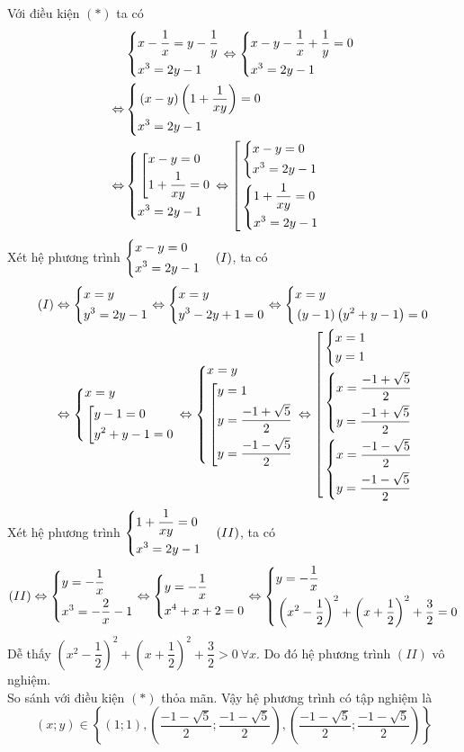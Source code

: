 \begin{ex}
{\begin{enumerate}
	Với điều kiện $(*)$ ta có
		\begin{align*}
	{ }&\left\{\begin{aligned}&x - \dfrac{1}{x} = y - \dfrac{1}{y}\\&x^3 = 2y - 1\end{aligned}\right.\Leftrightarrow \left\{\begin{aligned}&x  -  y - \dfrac{1}{x} + \dfrac{1}{y} = 0\\&x^3 = 2y - 1\end{aligned}\right.\\
	\Leftrightarrow &\left\{\begin{aligned}&\left(x  -  y\right)\left(1 + \dfrac{1}{xy}\right) = 0\\&x^3 = 2y - 1\end{aligned}\right.\\
	\Leftrightarrow &\left\{\begin{aligned}&\left[\begin{aligned}&x - y = 0\\&1 + \dfrac{1}{xy} = 0\end{aligned}\right.\\&x^3 = 2y - 1\end{aligned}\right.\Leftrightarrow \left[\begin{aligned}&\left\{\begin{aligned}&x - y = 0\\&x^3 = 2y -1\end{aligned}\right.\\&\left\{\begin{aligned}&1 + \dfrac{1}{xy} = 0\\&x^3 = 2y -1\end{aligned}\right.\end{aligned}\right.
	\end{align*}
	Xét hệ phương trình $\left\{\begin{aligned}&x - y = 0\\&x^3 = 2y - 1\end{aligned}\right.\quad (I)$, ta có 
\begin{align*}
(I)&\Leftrightarrow \left\{\begin{aligned}&x = y\\&y^3 = 2y - 1\end{aligned}\right.\Leftrightarrow \left\{\begin{aligned}&x = y\\&y^3 - 2y +1 = 0\end{aligned}\right.\Leftrightarrow \left\{\begin{aligned}&x = y\\&\left(y - 1\right)\left(y^2 + y - 1\right)  = 0\end{aligned}\right.\\
&\Leftrightarrow \left\{\begin{aligned}&x = y\\&\left[\begin{aligned}& y - 1= 0\\ &y^2 + y - 1 = 0\end{aligned}\right.\end{aligned}\right.\Leftrightarrow \left\{\begin{aligned}&x = y\\&\left[\begin{aligned}& y = 1\\ &y = \dfrac{- 1 + \sqrt{5}}{2}\\&y = \dfrac{- 1 - \sqrt{5}}{2}\end{aligned}\right.\end{aligned}\right.\Leftrightarrow\left[\begin{aligned}&\left\{\begin{aligned}&x = 1\\&y =1\end{aligned}\right.\\&\left\{\begin{aligned}&x = \dfrac{-1 + \sqrt{5}}{2}\\&y =\dfrac{-1 + \sqrt{5}}{2}\end{aligned}\right.\\&\left\{\begin{aligned}&x = \dfrac{-1 - \sqrt{5}}{2}\\&y =\dfrac{-1 - \sqrt{5}}{2}\end{aligned}\right.\end{aligned}\right.
\end{align*}
Xét hệ phương trình $\left\{\begin{aligned}&1 + \dfrac{1}{xy} = 0\\&x^3 = 2y - 1\end{aligned}\right.\quad (II)$, ta có 
$$(II) \Leftrightarrow \left\{\begin{aligned}&y = -\dfrac{1}{x}\\&x^3 = -\dfrac{2}{x} - 1\end{aligned}\right.\Leftrightarrow \left\{\begin{aligned}&y = -\dfrac{1}{x}\\&x^4 + x + 2 = 0\end{aligned}\right.\Leftrightarrow  \left\{\begin{aligned}&y = -\dfrac{1}{x}\\&\left(x^2 - \dfrac{1}{2}\right)^2 + \left(x + \dfrac{1}{2}\right)^2 + \dfrac{3}{2} = 0\end{aligned}\right.$$	
Dễ thấy $\left(x^2 - \dfrac{1}{2}\right)^2 + \left(x + \dfrac{1}{2}\right)^2 + \dfrac{3}{2} > 0\ \forall x$. Do đó hệ phương trình $(II)$ vô nghiệm.\\
So sánh với điều kiện $(*)$ thỏa mãn. Vậy hệ phương trình có tập nghiệm là
$$\left(x;y\right)\in \left\{ \left(1;1\right), \left(\dfrac{-1 - \sqrt{5}}{2}; \dfrac{-1 - \sqrt{5}}{2}\right), \left(\dfrac{-1 - \sqrt{5}}{2}; \dfrac{-1 - \sqrt{5}}{2}\right)\right\}$$



\end{enumerate}}
\end{ex}
